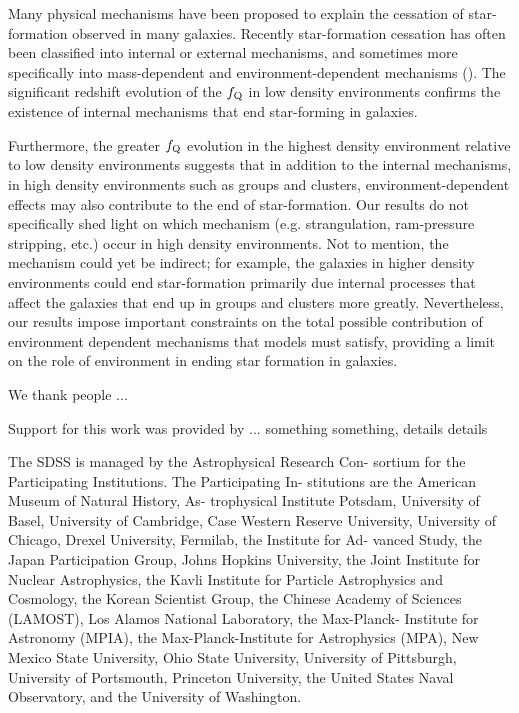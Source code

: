 \documentclass{emulateapj}
\begin{document}
Many physical mechanisms have been proposed to explain the cessation
of star-formation observed in many galaxies. Recently star-formation
cessation has often been classified into internal or external
mechanisms, and sometimes more specifically into mass-dependent and
environment-dependent mechanisms (\citealt{Baldry:2006aa,
  Peng:2010aa}). The significant redshift evolution of the
$f_{\rm{Q}}$ in low density environments confirms the existence of
internal mechanisms that end star-forming in galaxies.

Furthermore, the greater $f_{\rm{Q}}$ evolution in the highest density
environment relative to low density environments suggests that in
addition to the internal mechanisms, in high density environments such
as groups and clusters, environment-dependent effects may also
contribute to the end of star-formation. Our results do not
specifically shed light on which mechanism (e.g. strangulation,
ram-pressure stripping, etc.) occur in high density environments. Not to 
mention, the mechanism could yet be indirect; for example, the
galaxies in higher density environments could end star-formation
primarily due internal processes that affect the galaxies that end up
in groups and clusters more greatly.  Nevertheless, our results impose
important constraints on the total possible contribution of
environment dependent mechanisms that models must satisfy, providing a
limit on the role of environment in ending star formation in
galaxies. 

\bigskip 
We thank people ...

Support for this work was provided by ... 
something something, details details

The SDSS is managed by the Astrophysical Research Con- sortium for the Participating Institutions. The Participating In- stitutions are the American Museum of Natural History, As- trophysical Institute Potsdam, University of Basel, University of Cambridge, Case Western Reserve University, University of Chicago, Drexel University, Fermilab, the Institute for Ad- vanced Study, the Japan Participation Group, Johns Hopkins University, the Joint Institute for Nuclear Astrophysics, the Kavli Institute for Particle Astrophysics and Cosmology, the Korean Scientist Group, the Chinese Academy of Sciences (LAMOST), Los Alamos National Laboratory, the Max-Planck- Institute for Astronomy (MPIA), the Max-Planck-Institute for Astrophysics (MPA), New Mexico State University, Ohio State University, University of Pittsburgh, University of Portsmouth, Princeton University, the United States Naval Observatory, and the University of Washington.
%
%

\end{document}
